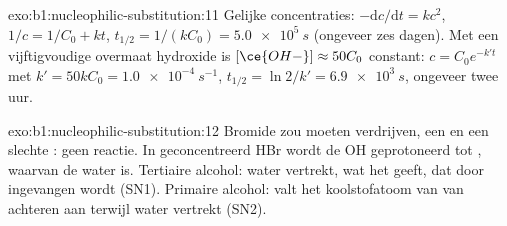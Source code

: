 \begin{solution}{exo:b1:nucleophilic-substitution:11}
Gelijke concentraties: $-\mathrm{d}c/\mathrm{d}t = kc^2$, $1/c = 1/C_0 + kt$,
$t_{1/2} = 1/(kC_0) = \qty{5.0e5}{s}$ (ongeveer zes dagen). Met een
vijftigvoudige overmaat hydroxide is $[\ce{OH-}] \approx 50C_0$ constant:
$c = C_0
e^{-k't}$ met $k' = 50kC_0 = \qty{1.0e-4}{s^{-1}}$, $t_{1/2} = \ln 2/k' =
\qty{6.9e3}{s}$, ongeveer twee uur.
\end{solution}

\begin{solution}{exo:b1:nucleophilic-substitution:12}
Bromide zou  moeten verdrijven, een  en een slechte
: geen reactie. In geconcentreerd HBr wordt de OH
geprotoneerd tot , waarvan de  water is.
Tertiaire alcohol: water vertrekt, wat het  geeft, dat door
 ingevangen wordt (SN1). Primaire alcohol:  valt het
koolstofatoom van  van achteren aan terwijl water vertrekt
(SN2).
\end{solution}

